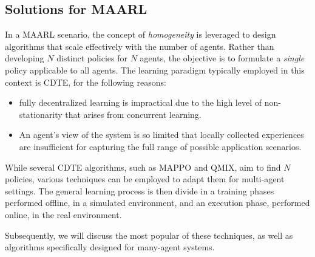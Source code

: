 \subsection{Solutions for \ac{MAARL}}
In a \ac{MAARL} scenario, 
 the concept of \emph{homogeneity} is leveraged to design algorithms that scale effectively with the number of agents. 
 Rather than developing $N$ distinct policies for $N$ agents, 
 the objective is to formulate a \emph{single} policy applicable to all agents.
%
The learning paradigm typically employed in this context is CDTE, for the following reasons:
\begin{itemize}
\item fully decentralized learning is impractical due to the high level of non-stationarity 
 that arises from concurrent learning.
\item An agent's view of the system is so limited that locally 
 collected experiences are insufficient for capturing the full range of possible application scenarios.
\end{itemize}
While several CDTE algorithms, such as MAPPO and QMIX, aim to find $N$ policies, various techniques can be employed to adapt them for multi-agent settings. 
The general learning process is then divide in a training phases performed offline, in a simulated environment, and an execution phase, performed online, in the real environment.

Subsequently, we will discuss the most popular of these techniques, as well as algorithms specifically designed for many-agent systems.
